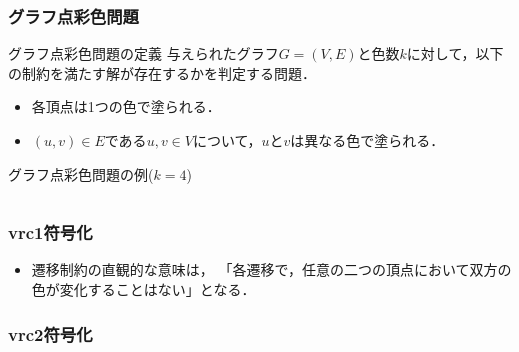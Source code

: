 \begin{frame}\frametitle{グラフ点彩色問題}
    
  \begin{block}{グラフ点彩色問題の定義}
    与えられたグラフ$G=(V, E)$と色数$k$に対して，以下の制約を満たす解が存在するかを判定する問題．
    \begin{itemize}
      \item 各頂点は1つの色で塗られる．
      \item $(u, v) \in E$である$u, v \in V$について，$u$と$v$は異なる色で塗られる．
    \end{itemize}
  \end{block}
  
  \begin{exampleblock}{グラフ点彩色問題の例($k=4$)}
    \begin{columns}
      \begin{column}{1.0\textwidth}
        \centering
        
      \end{column}
    \end{columns}
  \end{exampleblock}

\end{frame}


\begin{frame}\frametitle{vrc1符号化}
  \begin{exampleblock}{}\centering
     
   \end{exampleblock}

   \begin{itemize}
     \item 遷移制約の直観的な意味は，
    「各遷移で，任意の二つの頂点において双方の色が変化することはない」となる．
   \end{itemize}
\end{frame}


\begin{frame}\frametitle{vrc2符号化}
  \begin{exampleblock}{}\centering
     
   \end{exampleblock}
\end{frame}


